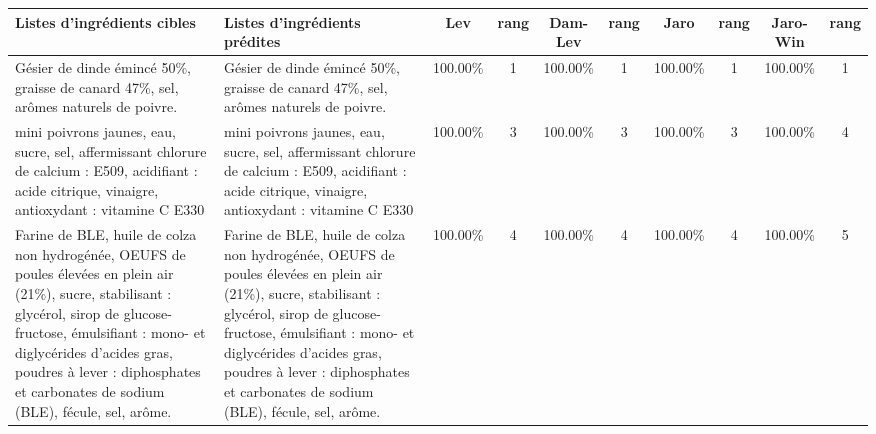 \begin{tabular}{p{5cm}p{5cm}cccccccc}
\toprule
                                                                                                                                                                                                                                                              Listes d'ingrédients cibles &                                                                                                                                                                                                                                                                                                                               Listes d'ingrédients prédites &     Lev & rang & Dam-Lev & rang &    Jaro & rang & Jaro-Win & rang \\ \hline
                                                                                                                                                                                                       Gésier de dinde émincé 50\%, graisse de canard 47\%, sel, arômes naturels de poivre. &                                                                                                                                                                                                                                                                     Gésier de dinde émincé 50\%,  graisse de canard 47\%, sel, arômes naturels de poivre.  \newline   & 100.00\% &    1 & 100.00\% &    1 & 100.00\% &    1 &  100.00\% &    1 \\ \hline
\midrule
                                                                                                                                     mini poivrons jaunes, eau, sucre, sel, affermissant chlorure de calcium : E509, acidifiant : acide citrique, vinaigre, antioxydant : vitamine C E330 &                                                                                                                                                                                                   mini poivrons jaunes, eau, sucre, sel, affermissant chlorure de  \newline calcium : E509, acidifiant : acide citrique, vinaigre, antioxydant :  \newline vitamine C E330  & 100.00\% &    3 & 100.00\% &    3 & 100.00\% &    3 &  100.00\% &    4 \\ \hline
 Farine de BLE, huile de colza non hydrogénée, OEUFS de poules élevées en plein air (21\%), sucre, stabilisant : glycérol, sirop de glucose-fructose, émulsifiant : mono- et diglycérides d'acides gras, poudres à lever : diphosphates et carbonates de sodium (BLE), fécule, sel, arôme. &                                                                  Farine de BLE, huile de colza non hydrogénée, OEUFS de poules élevées en plein air (21\%), sucre, stabilisant : glycérol, sirop de glucose-fructose, émulsifiant : mono- et diglycérides d'acides gras,  \newline poudres à lever : diphosphates et carbonates de sodium (BLE), fécule, sel, arôme. & 100.00\% &    4 & 100.00\% &    4 & 100.00\% &    4 &  100.00\% &    5 \\ \hline

\end{tabular}
